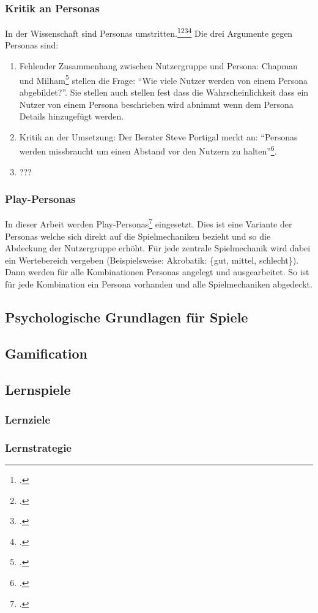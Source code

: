 	\subsubsection{Kritik an Personas}
		In der Wissenschaft sind Personas umstritten.\footcite{persona-crit}\footcite{persona-crit2}\footcite{persona-crit3}\footcite{persona-crit4} Die drei Argumente gegen Personas sind:
		\begin{enumerate}
			\item{ Fehlender Zusammenhang zwischen Nutzergruppe und Persona: Chapman und Milham\footcite{persona-crit} stellen die Frage: \enquote{Wie viele Nutzer werden von einem Persona abgebildet?}. Sie stellen auch stellen fest dass die Wahrscheinlichkeit dass ein Nutzer von einem Persona beschrieben wird abnimmt wenn dem Persona Details hinzugefügt werden. }
			\item{ Kritik an der Umsetzung: Der Berater Steve Portigal merkt an: \enquote{Personas werden missbraucht um einen Abstand vor den Nutzern zu halten}\footcite{persona-crit4}. }
			\item{ ??? }
		\end{enumerate}
	\subsubsection{Play-Personas}
		In dieser Arbeit werden Play-Personas\footcite{play-persona} eingesetzt. Dies ist eine Variante der Personas welche sich direkt auf die Spielmechaniken bezieht und so die Abdeckung der Nutzergruppe erhöht. Für jede zentrale Spielmechanik wird dabei ein Wertebereich vergeben (Beispielsweise: Akrobatik: \{gut, mittel, schlecht\}). Dann werden für alle Kombinationen Personas angelegt und ausgearbeitet. So ist für jede Kombination ein Persona vorhanden und alle Spielmechaniken abgedeckt.
\subsection{Psychologische Grundlagen für Spiele}
\subsection{Gamification}
\subsection{Lernspiele}
	\subsubsection{Lernziele}
	\subsubsection{Lernstrategie}
